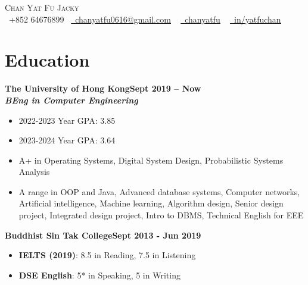 \documentclass[a4paper,10pt]{article}
\begin{document}
\begin{center}
  {\Huge \scshape Chan Yat Fu Jacky} \\ \vspace{5pt}
  \small \raisebox{-0.1\height}\faPhone\ +852 64676899~ \href{mailto:chanyatfu0616@gmail.com}{\raisebox{-0.2\height}\faEnvelope\  \underline{chanyatfu0616@gmail.com}} ~
  \href{https://github.com/chanyatfu}{\raisebox{-0.2\height}\faGithub\ \underline{chanyatfu}} ~
  \href{https://hk.linkedin.com/in/yatfuchan}{\raisebox{-0.2\height}\faLinkedin\ \underline{in/yatfuchan}}  ~
  \vspace{-3pt}
\end{center}

\newcommand*{\bb}[2]{{\small\bfseries#1\hfill{\small#2}}\\}
\newcommand*{\cc}[2]{{\bfseries\textit{\small#1}\hfill\textit{\small#2}}\\}
\newenvironment{tightitemize}{\begin{itemize}[leftmargin=2em,topsep=1pt,partopsep=1pt,noitemsep]\small}{\end{itemize}\vspace*{2pt}}

\section{Education}

\bb{The University of Hong Kong}{Sept 2019 -- Now}
\cc{BEng in Computer Engineering}{}
\begin{tightitemize}
  \item 2022-2023 Year GPA: 3.85
  \item 2023-2024 Year GPA: 3.64
  \item A+ in Operating Systems, Digital System Design, Probabilistic Systems Analysis
  \item A range in OOP and Java, Advanced database systems, Computer networks, Artificial intelligence, Machine learning, Algorithm design, Senior design project, Integrated design project, Intro to DBMS, Technical English for EEE
\end{tightitemize}

\bb{Buddhist Sin Tak College}{Sept 2013 - Jun 2019}
\begin{tightitemize}
  \item \textbf{IELTS (2019)}: 8.5 in Reading, 7.5 in Listening
  \item \textbf{DSE English}: 5* in Speaking, 5 in Writing
\end{tightitemize}
\end{document}
